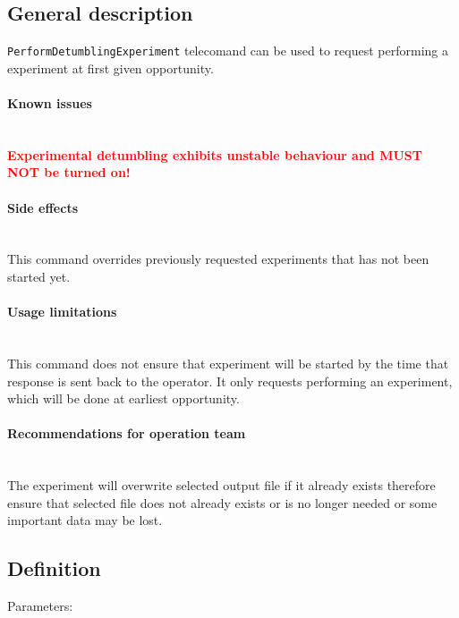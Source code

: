 

\subsection{General description}
\texttt{PerformDetumblingExperiment} telecomand can be used to request performing a \detumbling 
experiment at first given opportunity.

\paragraph{Known issues} \mbox{} \\
\textcolor{red}{\bfseries{Experimental detumbling exhibits unstable behaviour and MUST NOT be turned on!}}

\paragraph{Side effects} \mbox{} \\
This command overrides previously requested experiments that has not been started yet. 

\paragraph{Usage limitations} \mbox{} \\
This command does not ensure that \detumbling experiment will be started by the time that 
response is sent back to the operator. It only requests performing an experiment, which 
will be done at earliest opportunity.

\paragraph{Recommendations for operation team} \mbox{} \\
The experiment will overwrite selected output file if it already exists therefore ensure 
that selected file does not already exists or is no longer needed or some important data
may be lost.

\subsection{Definition}

Parameters:


